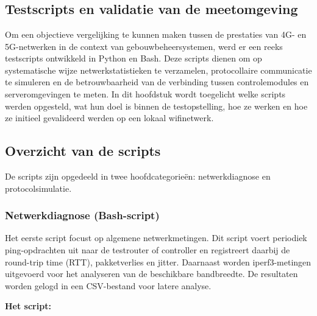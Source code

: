 \chapter{}%
\label{ch:scripts}

\section*{Testscripts en validatie van de meetomgeving}

Om een objectieve vergelijking te kunnen maken tussen de prestaties van 4G- en 5G-netwerken in de context van gebouwbeheersystemen, werd er een reeks testscripts ontwikkeld in Python en Bash. Deze scripts dienen om op systematische wijze netwerkstatistieken te verzamelen, protocollaire communicatie te simuleren en de betrouwbaarheid van de verbinding tussen controlemodules en serveromgevingen te meten. In dit hoofdstuk wordt toegelicht welke scripts werden opgesteld, wat hun doel is binnen de testopstelling, hoe ze werken en hoe ze initieel gevalideerd werden op een lokaal wifinetwerk.

\section{Overzicht van de scripts}

De scripts zijn opgedeeld in twee hoofdcategorieën: netwerkdiagnose en protocolsimulatie.

\subsection*{Netwerkdiagnose (Bash-script)}

Het eerste script focust op algemene netwerkmetingen. Dit script voert periodiek ping-opdrachten uit naar de testrouter of controller en registreert daarbij de round-trip time (RTT), pakketverlies en jitter. Daarnaast worden iperf3-metingen uitgevoerd voor het analyseren van de beschikbare bandbreedte. De resultaten worden gelogd in een CSV-bestand voor latere analyse.

\textbf{Het script:}
%    

